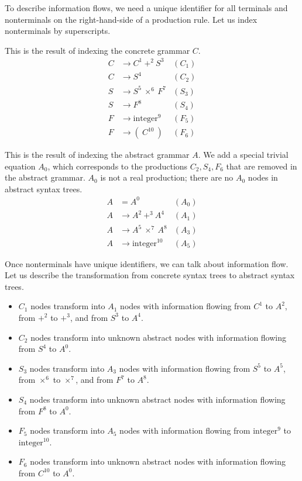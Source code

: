 \documentclass{amsart}
\gdef\R{\rightarrow}
\begin{document}
To describe information flows, we need a unique identifier for
all terminals and nonterminals on the right-hand-side of a
production rule. Let us index nonterminals by superscripts.

This is the result of indexing the concrete grammar $C$.
\begin{align*}
C &\R C^1~+^2~S^3 & (C_1) \\
C &\R S^4     & (C_2) \\
S &\R S^5~\times^6~F^7 & (S_3) \\
S &\R F^8     & (S_4) \\
F &\R \mbox{integer}^9 & (F_5) \\
F &\R (~C^{10}~) & (F_6)
\end{align*}

This is the result of indexing the abstract grammar $A$. We add
a special trivial equation $A_0$, which corresponds to the
productions $C_2,S_4,F_6$ that are removed in the abstract
grammar. $A_0$ is not a real production; there are no $A_0$ nodes
in abstract syntax trees.
\begin{align*}
A &= A^0       & (A_0) \\
A &\R A^2~+^3~A^4 & (A_1) \\
A &\R A^5~\times^7~A^8 & (A_3) \\
A &\R \mbox{integer}^{10} & (A_5)
\end{align*}

Once nonterminals have unique identifiers, we can talk about
information flow. Let us describe the transformation from
concrete syntax trees to abstract syntax trees.
\begin{itemize}
\item $C_1$ nodes transform into $A_1$ nodes with information
flowing from $C^1$ to $A^2$, from $+^2$ to $+^3$, and from $S^3$
to $A^4$.
\item $C_2$ nodes transform into unknown abstract nodes with
information flowing from $S^4$ to $A^0$.
\item $S_3$ nodes transform into $A_3$ nodes with information
flowing from $S^5$ to $A^5$, from $\times^6$ to $\times^7$, and
from $F^7$ to $A^8$.
\item $S_4$ nodes transform into unknown abstract nodes with
information flowing from $F^8$ to $A^0$.
\item $F_5$ nodes transform into $A_5$ nodes with information
flowing from $\mbox{integer}^9$ to $\mbox{integer}^{10}$.
\item $F_6$ nodes transform into unknown abstract nodes with
information flowing from $C^{10}$ to $A^0$.
\end{itemize}
\end{document}
